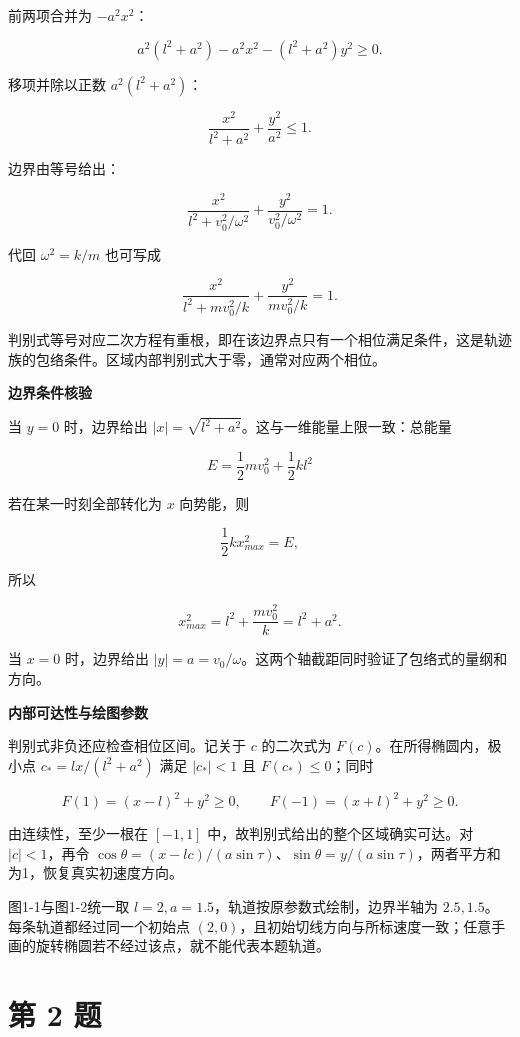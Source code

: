 \documentclass[12pt,a4paper,UTF8]{ctexart}
\begin{document}
前两项合并为 \(-a^2x^2\)：

\[a^2(l^2+a^2)-a^2x^2-(l^2+a^2)y^2\ge0.\]

移项并除以正数 \(a^2(l^2+a^2)\)：

\[\frac{x^2}{l^2+a^2}+\frac{y^2}{a^2}\le1.\]

边界由等号给出：

\[\boxed{
\frac{x^2}{l^2+v_0^2/\omega^2}
+\frac{y^2}{v_0^2/\omega^2}=1
}.\]

代回 \(\omega^2=k/m\) 也可写成

\[\boxed{
\frac{x^2}{l^2+mv_0^2/k}
+\frac{y^2}{mv_0^2/k}=1
}.\]

判别式等号对应二次方程有重根，即在该边界点只有一个相位满足条件，这是轨迹族的包络条件。区域内部判别式大于零，通常对应两个相位。

\textbf{边界条件核验}

当 \(y=0\) 时，边界给出
\(|x|=\sqrt{l^2+a^2}\)。这与一维能量上限一致：总能量

\[E=\frac12mv_0^2+\frac12kl^2\]

若在某一时刻全部转化为 \(x\) 向势能，则

\[\frac12kx_{max}^2=E,\]

所以

\[x_{max}^2=l^2+\frac{mv_0^2}{k}=l^2+a^2.\]

当 \(x=0\) 时，边界给出
\(|y|=a=v_0/\omega\)。这两个轴截距同时验证了包络式的量纲和方向。

\textbf{内部可达性与绘图参数}

判别式非负还应检查相位区间。记关于 \(c\) 的二次式为
\(F(c)\)。在所得椭圆内，极小点 \(c_*=lx/(l^2+a^2)\) 满足 \(|c_*|<1\) 且
\(F(c_*)\le0\)；同时

\[F(1)=(x-l)^2+y^2\ge0,\qquad F(-1)=(x+l)^2+y^2\ge0.\]

由连续性，至少一根在 \([-1,1]\) 中，故判别式给出的整个区域确实可达。对
\(|c|<1\)，再令
\(\cos\theta=(x-lc)/(a\sin\tau)\)、\(\sin\theta=y/(a\sin\tau)\)，两者平方和为1，恢复真实初速度方向。

图1-1与图1-2统一取 \(l=2,a=1.5\)，轨道按原参数式绘制，边界半轴为
\(2.5,1.5\)。每条轨道都经过同一个初始点
\((2,0)\)，且初始切线方向与所标速度一致；任意手画的旋转椭圆若不经过该点，就不能代表本题轨道。

\newpage

\section{第 2 题}\label{ux7b2c-2-ux9898}
\end{document}
